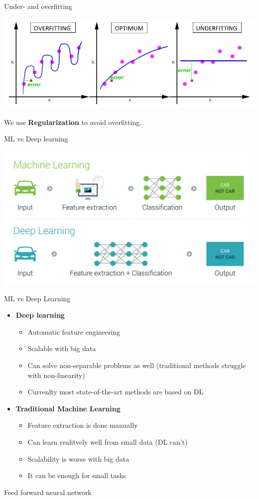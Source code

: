 \documentclass[bigger]{beamer}
\begin{document}
\begin{frame}{Under- and overfitting}
	
	\centering
    \includegraphics[width=.8\textwidth]{fig/underover.png}
    
    We use \textbf{Regularization} to avoid overfitting.
\end{frame}

\begin{frame}{ML vs Deep learning}
	
	\centering
	\includegraphics[width=.8\textwidth]{fig/ml}
\end{frame}


\begin{frame}{ML vs Deep Learning}
	\begin{itemize}
		\item \textbf{Deep learning}
		\begin{itemize}
			\item Automatic feature engineering
			\item Scalable with big data
			\item Can solve non-separable problems as well (traditional methods struggle with non-linearity)
			\item Currenlty most state-of-the-art methods are based on DL
		\end{itemize}
		\item \textbf{Traditional Machine Learning}
		\begin{itemize}
			\item Feature extraction is done manually
			\item Can learn realitvely well from small data (DL can't)
			\item Scalability is worse with big data
			\item It can be enough for small tasks
		\end{itemize}
	\end{itemize}
\end{frame}
\begin{frame}{Feed forward neural network}
    \def\layersep{2.1cm}

 
\end{frame}
\end{document}
